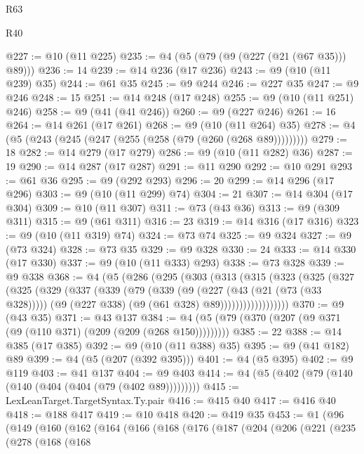 \begin{lexlean}{R63}
\begin{lexlean}{R40}
\begin{coremodule}
{{{{{{{{{{{{{{{{{{{{{{{{{{{{{{{{{{{{{{{{{{{{{{{{{{{{{{{{{{{{{{{{{{{{{{{{{{{{{{{{{{{{{{{{{{{{{{{{{{{{{{{{{{{{{@227 := @10 (@11 @225)
@235 := @4 (@5 (@79 (@9 (@227 (@21 (@67 @35))) @89)))
@236 := 14
@239 := @14 @236 (@17 @236)
@243 := @9 (@10 (@11 @239) @35)
@244 := @61 @35
@245 := @9 @244
@246 := @227 @35
@247 := @9 @246
@248 := 15
@251 := @14 @248 (@17 @248)
@255 := @9 (@10 (@11 @251) @246)
@258 := @9 (@41 (@41 @246))
@260 := @9 (@227 @246)
@261 := 16
@264 := @14 @261 (@17 @261)
@268 := @9 (@10 (@11 @264) @35)
@278 := @4 (@5 (@243 (@245 (@247 (@255 (@258 (@79 (@260 (@268 @89)))))))))
@279 := 18
@282 := @14 @279 (@17 @279)
@286 := @9 (@10 (@11 @282) @36)
@287 := 19
@290 := @14 @287 (@17 @287)
@291 := @11 @290
@292 := @10 @291
@293 := @61 @36
@295 := @9 (@292 @293)
@296 := 20
@299 := @14 @296 (@17 @296)
@303 := @9 (@10 (@11 @299) @74)
@304 := 21
@307 := @14 @304 (@17 @304)
@309 := @10 (@11 @307)
@311 := @73 (@43 @36)
@313 := @9 (@309 @311)
@315 := @9 (@61 @311)
@316 := 23
@319 := @14 @316 (@17 @316)
@323 := @9 (@10 (@11 @319) @74)
@324 := @73 @74
@325 := @9 @324
@327 := @9 (@73 @324)
@328 := @73 @35
@329 := @9 @328
@330 := 24
@333 := @14 @330 (@17 @330)
@337 := @9 (@10 (@11 @333) @293)
@338 := @73 @328
@339 := @9 @338
@368 := @4
    (@5
      (@286
        (@295
          (@303
            (@313
              (@315
                (@323
                  (@325
                    (@327
                      (@325
                        (@329
                          (@337
                            (@339
                              (@79
                                (@339
                                  (@9
                                    (@227 (@43 (@21 (@73 (@33 @328)))))
                                    (@9 (@227 @338) (@9 (@61 @328) @89))))))))))))))))))
@370 := @9 (@43 @35)
@371 := @43 @137
@384 := @4 (@5 (@79 (@370 (@207 (@9 @371 (@9 (@110 @371) (@209 (@209 (@268 @150)))))))))
@385 := 22
@388 := @14 @385 (@17 @385)
@392 := @9 (@10 (@11 @388) @35)
@395 := @9 (@41 @182) @89
@399 := @4 (@5 (@207 (@392 @395)))
@401 := @4 (@5 @395)
@402 := @9 @119
@403 := @41 @137
@404 := @9 @403
@414 := @4 (@5 (@402 (@79 (@140 (@140 (@404 (@404 (@79 (@402 @89)))))))))
@415 := LexLeanTarget.TargetSyntax.Ty.pair
@416 := @415 @40
@417 := @416 @40
@418 := @188 @417
@419 := @10 @418
@420 := @419 @35
@453 := @1
    (@96
      (@149
        (@160
          (@162
            (@164
              (@166
                (@168
                  (@176
                    (@187
                      (@204
                        (@206
                          (@221
                            (@235
                              (@278
                                (@168
                                  (@168
}}}}}}}}}}}}}}}}}}}}}}}}}}}}}}}}}}}}}}}}}}}}}}}}}}}}}}}}}}}}}}}}}}}}}}}}}}}}}}}}}}}}}}}}}}}}}}}}}}}}}}}}}}}}}
\end{coremodule}
\end{lexlean}
\end{lexlean}
